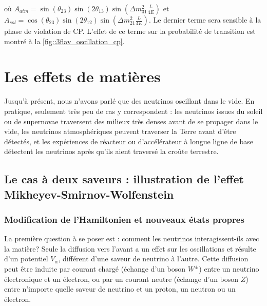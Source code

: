         où $A_{atm} = \sin(\theta_{23})\sin(2\theta_{13})\sin\left(\Delta m^2_{31}\frac{L}{4E}\right)$ et $A_{sol} =\cos(\theta_{23})\sin(2\theta_{12})\sin\left(\Delta m^2_{21}\frac{L}{4E}\right)$. Le dernier terme sera sensible à la phase de violation de CP. L'effet de ce terme sur la probabilité de transition est montré à la \autoref{fig::3flav_oscillation_cp}.
    

  \section{Les effets de matières}\label{sec::matter_effect}
    Jusqu'à présent, nous n'avons parlé que des neutrinos oscillant dans le vide. En pratique, seulement très peu de cas y correspondent : les neutrinos issues du soleil ou de supernovae traversent des milieux très denses avant de se propager dans le vide, les neutrinos atmosphériques peuvent traverser la Terre avant d'être détectés, et les expériences de réacteur ou d'accélérateur à longue ligne de base détectent les neutrinos après qu'ils aient traversé la croûte terrestre.
    \subsection{Le cas à deux saveurs : illustration de l'effet Mikheyev-Smirnov-Wolfenstein}
      \subsubsection{Modification de l'Hamiltonien et nouveaux états propres}
        La première question à se poser est : comment les neutrinos interagissent-ils avec la matière? Seule la diffusion vers l'avant a un effet sur les oscillations\cite{Wolfenstein1978,Akhmedov2000} et résulte d'un potentiel $V_{\alpha}$, différent d'une saveur de neutrino à l'autre. Cette diffusion peut être induite par courant chargé (échange d'un boson $W^{\pm}$) entre un neutrino électronique et un électron, ou par un courant neutre (échange d'un boson $Z$) entre n'importe quelle saveur de neutrino et un proton, un neutron ou un électron.

